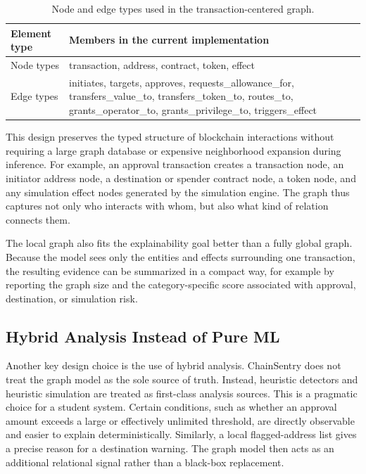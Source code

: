 \documentclass[11pt]{article}
\begin{document}
\begin{table}[H]
\centering
\caption{Node and edge types used in the transaction-centered graph.}
\label{tab:graphschema}
\begin{tabular}{p{4cm} p{8.8cm}}
\toprule
Element type & Members in the current implementation \\
\midrule
Node types & transaction, address, contract, token, effect \\
Edge types & initiates, targets, approves, requests\_allowance\_for, transfers\_value\_to, transfers\_token\_to, routes\_to, grants\_operator\_to, grants\_privilege\_to, triggers\_effect \\
\bottomrule
\end{tabular}
\end{table}

This design preserves the typed structure of blockchain interactions without requiring a large graph database or expensive neighborhood expansion during inference. For example, an approval transaction creates a transaction node, an initiator address node, a destination or spender contract node, a token node, and any simulation effect nodes generated by the simulation engine. The graph thus captures not only who interacts with whom, but also what kind of relation connects them.

The local graph also fits the explainability goal better than a fully global graph. Because the model sees only the entities and effects surrounding one transaction, the resulting evidence can be summarized in a compact way, for example by reporting the graph size and the category-specific score associated with approval, destination, or simulation risk.

\subsection{Hybrid Analysis Instead of Pure ML}

Another key design choice is the use of hybrid analysis. ChainSentry does not treat the graph model as the sole source of truth. Instead, heuristic detectors and heuristic simulation are treated as first-class analysis sources. This is a pragmatic choice for a student system. Certain conditions, such as whether an approval amount exceeds a large or effectively unlimited threshold, are directly observable and easier to explain deterministically. Similarly, a local flagged-address list gives a precise reason for a destination warning. The graph model then acts as an additional relational signal rather than a black-box replacement.
\end{document}
